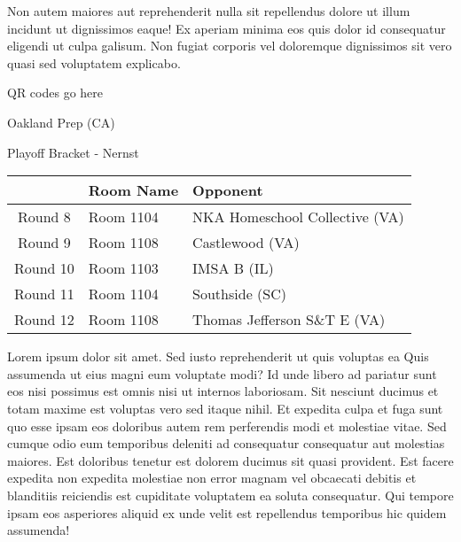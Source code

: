 \documentclass{article}%
\begin{document}
\newline%
Non autem maiores aut reprehenderit nulla sit repellendus dolore ut illum incidunt ut dignissimos eaque! Ex aperiam minima eos quis dolor id consequatur eligendi ut culpa galisum. Non fugiat corporis vel doloremque dignissimos sit vero quasi sed voluptatem explicabo.\newline%
\newline%
%
\vspace*{30pt}%
\begin{center}%
\begin{Huge}%
QR codes go here%
\end{Huge}%
\end{center}%
\newpage%
\begin{center}%
\begin{Huge}%
Oakland Prep (CA)%
\end{Huge}%
\vspace*{8pt}%
\linebreak%
\begin{Large}%
Playoff Bracket {-} Nernst%
\end{Large}%
\end{center}%
\begin{tabularx}{\textwidth}{|c|Y|Y|}%
\hline%
&Room Name&Opponent\\%
\hline%
Round 8&Room 1104&NKA Homeschool Collective (VA)\\%
Round 9&Room 1108&Castlewood (VA)\\%
Round 10&Room 1103&IMSA B (IL)\\%
Round 11&Room 1104&Southside (SC)\\%
Round 12&Room 1108&Thomas Jefferson S\&T E (VA)\\%
\hline%
\end{tabularx}%
\vspace*{8pt}%
\linebreak%
\newline%
\newline%
Lorem ipsum dolor sit amet. Sed iusto reprehenderit ut quis voluptas ea Quis assumenda ut eius magni eum voluptate modi? Id unde libero ad pariatur sunt eos nisi possimus est omnis nisi ut internos laboriosam. Sit nesciunt ducimus et totam maxime est voluptas vero sed itaque nihil. Et expedita culpa et fuga sunt quo esse ipsam eos doloribus autem rem perferendis modi et molestiae vitae.\newline%
\newline%
Sed cumque odio eum temporibus deleniti ad consequatur consequatur aut molestias maiores. Est doloribus tenetur est dolorem ducimus sit quasi provident. Est facere expedita non expedita molestiae non error magnam vel obcaecati debitis et blanditiis reiciendis est cupiditate voluptatem ea soluta consequatur. Qui tempore ipsam eos asperiores aliquid ex unde velit est repellendus temporibus hic quidem assumenda!\newline%
\end{document}
